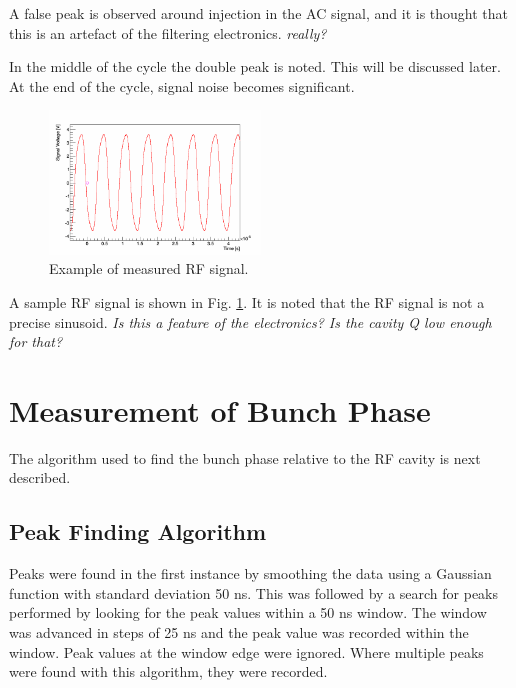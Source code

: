 \documentclass{paper}
\begin{document}
A false peak is observed around injection in the AC signal, and it is thought that this 
is an artefact of the filtering electronics. \emph{really?}

In the middle of the cycle the double peak is noted. This will be discussed 
later. At the end of the cycle, signal noise becomes significant.

\begin{figure}
		\includegraphics[width=0.5\textwidth]{images/v=7_18_signal_rf}
	\caption{Example of measured RF signal.}
	\label{fig:rf_signal}
\end{figure}

A sample RF signal is shown in Fig. \ref{fig:rf_signal}. It is noted that the
RF signal is not a precise sinusoid. \emph{Is this a feature of the electronics?
Is the cavity Q low enough for that?}

\section{Measurement of Bunch Phase}

The algorithm used to find the bunch phase relative to the RF cavity is next
described.

\subsection{Peak Finding Algorithm}
Peaks were found in the first instance by smoothing the data using a Gaussian
function with standard deviation 50 ns. This was followed by a search for peaks 
performed by looking for the peak values within a 50 ns window. The window was
advanced in steps of 25 ns and the peak value was recorded within the window. 
Peak values at the window edge were ignored. Where multiple peaks were found
with this algorithm, they were recorded.
\end{document}
